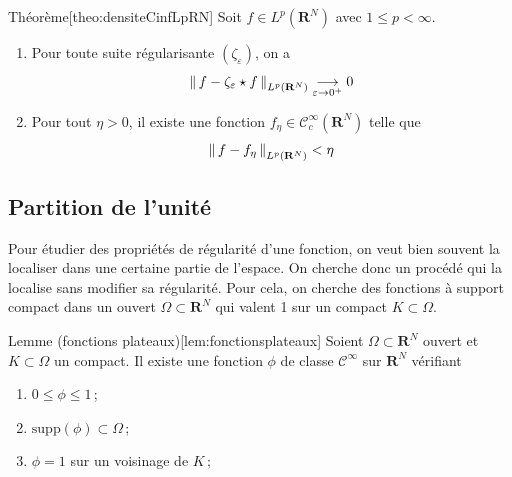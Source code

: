         \begin{omed}{Théorème}[theo:densiteCinfLpRN]
            Soit $f \in L^p(\mathbf{R}^N)$ avec $1 \leq p < \infty$. 
            \begin{enumerate}[label=($p_{\arabic*}$)]
                \item Pour toute suite régularisante $(\zeta_{\varepsilon})$, on a 
                \[ \left\lVert \, f - \zeta_{\varepsilon} \star f \, \right\rVert_{L^p(\mathbf{R}^N)} \underset{\varepsilon \to 0^+}{\longrightarrow} 0 \]   
                \item Pour tout $\eta > 0$, il existe une fonction $f_{\eta} \in \mathcal{C}^{\infty}_c(\mathbf{R}^N)$ telle que 
                \[ \left\lVert \, f - f_{\eta} \, \right\rVert_{L^p(\mathbf{R}^N)} < \eta \]
            \end{enumerate}
        \end{omed}

    \subsection{Partition de l’unité}

        Pour étudier des propriétés de régularité d’une fonction, on veut bien souvent la localiser dans une certaine partie de l’espace. On cherche donc un procédé qui la localise sans modifier sa régularité. Pour cela, on cherche des fonctions à support compact dans un ouvert $\Omega \subset \mathbf{R}^N$ qui valent 1 sur un compact $K \subset \Omega$. 

        \begin{omed}{Lemme (fonctions plateaux)}[lem:fonctionsplateaux]
            Soient $\Omega \subset \mathbf{R}^N$ ouvert et $K \subset \Omega$ un compact. Il existe une fonction $\phi$ de classe $\mathcal{C}^{\infty}$ sur $\mathbf{R}^N$ vérifiant 
            \begin{enumerate}[label=($h_{\arabic*}$)]
                \item $0 \leq \phi \leq 1$ ;
                \item $\text{supp}(\phi) \subset \Omega$ ;
                \item $\phi = 1$ sur un voisinage de $K$ ;
            \end{enumerate}
        \end{omed}

